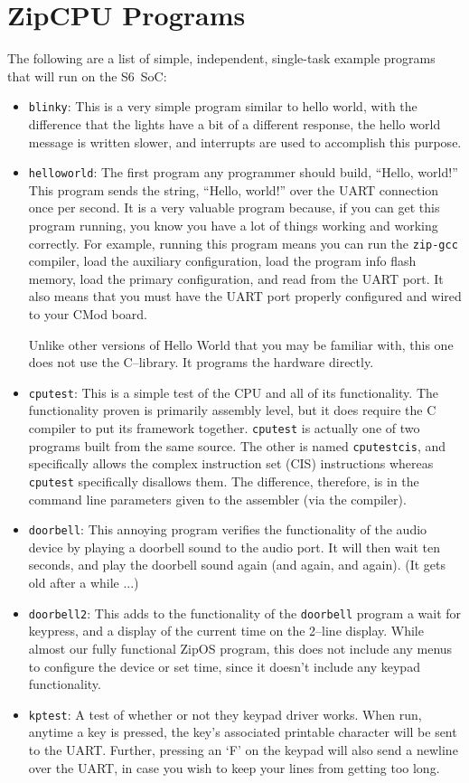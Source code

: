 \documentclass{gqtekspec}
\begin{document}
\section{ZipCPU Programs}
The following are a list of simple, independent, single-task example programs
that will run on the S6~SoC:
\begin{itemize}
\item {\tt blinky}: This is a very simple program similar to hello world, with
	the difference that the lights have a bit of a different response, the
	hello world message is written slower, and interrupts are used to
	accomplish this purpose.
\item {\tt helloworld}: The first program any programmer should build,
	``Hello, world!''  This program sends the string, ``Hello, world!''
	over the UART connection once per second.  It is a very valuable
	program because, if you can get this program running, you know you have
	a lot of things working and working correctly.  For example, running
	this program means you can run the {\tt zip-gcc} compiler, load
	the auxiliary configuration, load the program info flash memory, load
	the primary configuration, and read from the UART port.  It also means
	that you must have the UART port properly configured and wired to your
	CMod board.

	Unlike other versions of Hello World that you may be familiar with,
	this one does not use the C--library.  It programs the hardware
	directly.
\item {\tt cputest}: This is a simple test of the CPU and all of its
	functionality.
	The functionality proven is primarily assembly
	level, but it does require the C compiler to put its framework
	together.
	{\tt cputest} is actually one of two programs built from the same
	source.  The other is named {\tt cputestcis}, and specifically
	allows the complex instruction set (CIS) instructions whereas
	{\tt cputest} specifically disallows them.  The difference, therefore,
	is in the command line parameters given to the assembler (via the
	compiler).
\item {\tt doorbell}: This annoying program verifies the functionality of the
	audio device by playing a doorbell sound to the audio port.  It will
	then wait ten seconds, and play the doorbell sound again (and again,
	and again).  (It gets old after a while ...)
\item {\tt doorbell2}: This adds to the functionality of the {\tt doorbell}
	program a wait for keypress, and a display of the current time on the
	2--line display.  While almost our fully functional ZipOS program, this
	does not include any menus to configure the device or set time, since
	it doesn't include any keypad functionality.
\item {\tt kptest}: A test of whether or not they keypad driver works.  When
	run, anytime a key is pressed, the key's associated printable character
	will be sent to the UART.  Further, pressing an `F' on the keypad will
	also send a newline over the UART, in case you wish to keep your lines
	from getting too long.
\end{itemize}
\end{document}
